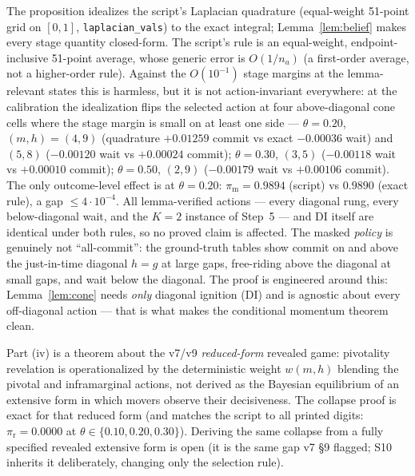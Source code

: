 \begin{remark}
The proposition idealizes the script's Laplacian quadrature (equal-weight 51-point grid on $[0,1]$, \texttt{laplacian\_vals}) to the exact integral; Lemma~\ref{lem:belief} makes every stage quantity closed-form. The script's rule is an equal-weight, endpoint-inclusive 51-point average, whose generic error is $O(1/n_a)$ (a first-order average, not a higher-order rule). Against the $O(10^{-1})$ stage margins at the lemma-relevant states this is harmless, but it is not action-invariant everywhere: at the calibration the idealization flips the selected action at four above-diagonal cone cells where the stage margin is small on at least one side --- $\theta = 0.20$, $(m,h) = (4,9)$ (quadrature $+0.01259$ commit vs exact $-0.00036$ wait) and $(5,8)$ ($-0.00120$ wait vs $+0.00024$ commit); $\theta = 0.30$, $(3,5)$ ($-0.00118$ wait vs $+0.00010$ commit); $\theta = 0.50$, $(2,9)$ ($-0.00179$ wait vs $+0.00106$ commit). The only outcome-level effect is at $\theta = 0.20$: $\pi_{\mathrm{m}} = 0.9894$ (script) vs $0.9890$ (exact rule), a gap $\le 4 \cdot 10^{-4}$. All lemma-verified actions --- every diagonal rung, every below-diagonal wait, and the $K = 2$ instance of Step~5 --- and DI itself are identical under both rules, so no proved claim is affected. The masked \emph{policy} is genuinely not ``all-commit'': the ground-truth tables show commit on and above the just-in-time diagonal $h = g$ at large gaps, free-riding above the diagonal at small gaps, and wait below the diagonal. The proof is engineered around this: Lemma~\ref{lem:cone} needs \emph{only} diagonal ignition (DI) and is agnostic about every off-diagonal action --- that is what makes the conditional momentum theorem clean.
\end{remark}

\begin{remark}
Part (iv) is a theorem about the v7/v9 \emph{reduced-form} revealed game: pivotality revelation is operationalized by the deterministic weight $w(m,h)$ blending the pivotal and inframarginal actions, not derived as the Bayesian equilibrium of an extensive form in which movers observe their decisiveness. The collapse proof is exact for that reduced form (and matches the script to all printed digits: $\pi_{\mathrm{r}} = 0.0000$ at $\theta \in \{0.10, 0.20, 0.30\}$). Deriving the same collapse from a fully specified revealed extensive form is open (it is the same gap v7 \S 9 flagged; S10 inherits it deliberately, changing only the selection rule).
\end{remark}

